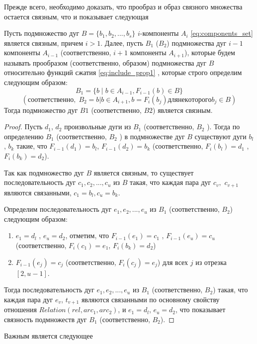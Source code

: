 Прежде всего, необходимо доказать, что прообраз и образ связного множества остается связным, что и показывает следующая

\begin{lemma}
Пусть подмножество дуг $B = \{b_1, b_2, ..., b_s\}$  $i$-компоненты $A_i$ \ref{eq:components_set}  является связным, причем  $i > 1$.  Далее, пусть  $B_1$ ($B_2$) подмножества дуг $i-1$ компоненты $A_{i-1}$  (соответственно,  $i+1$ компоненты $A_{i+1}$), которые будем   называть прообразом  (соответственно,  образом)  подмножества  дуг $B$ относительно функций сжатия \ref{eq:include_prop1} , которые строго определим следующим образом: 
$$B_1 = \{b\; |\; b \in A_{i-1}, F_{i-1} (b) \in B \} $$
$$(\text{соответственно},\; B_2 = {b | b \in A_{i+1} , b  = F_i (b_j)  для некоторого b_j \in B })$$
Тогда подмножество дуг  $B1$ (соответственно,   $B2$) является связным.
\end{lemma}
\begin{proof}
Пусть  $d_1$, $d_2$   произвольные дуги из $B_1$  (соответственно, $B_2$ ). Тогда по определению $B_1$  (соответственно,   $B_2$ ) в подмножестве дуг $B$ существуют  дуги  $b_l$, $b_k$  такие, что $F_{i-1}(d_1) = b_l$, $F_{i-1} (d_2) = b_k$ (соответственно,  $F_i (b_l) = d_1$ , $F_i (b_k) = d_2$).

Так как  подмножество дуг $B$ является связным, то  существует последовательность дуг  $c_1, c_2, ..., c_u$  из   $B$ такая, что  каждая пара дуг $c_v,$ $c_{v+1}$ являются связанными,  $c_1 = b_l , c_u = b_k$. 

Определим  последовательность дуг $e_1, e_2, ..., e_u$ из $B_1$ (соответственно, $B_2$) следующим образом:
\begin{enumerate}
\item $e_1 = d_l$ , $e_u = d_2$, отметим, что $F_{i-1} (e_1) = c_1$ , $F_{i-1} (e_u) = c_u$ (соответственно,  $F_i (c_1) = e_1$, $F_i(b_k) = d_2$)
\item $F_{i-1}(e_j) = c_j$  (соответственно,  $F_i (c_j) = e_j$)   для всех $j$  из отрезка  
$[2, u - 1]$.
\end{enumerate}
Тогда  последовательность дуг $e_1, e_2, ..., e_u$ из $B_1$ (соответственно, $B_2$) такая, что  каждая пара дуг $e_v$, $t_{v+1}$ являются связанными по основному свойству отношения $Relation(rel, arc_1, arc_2)$, и  $e_1 = d_l$, $e_u = d_2$, что показывает связность подмножеств дуг $B_1$ (соответственно, $B_2$).
\end{proof}

Важным является следующее  
       
